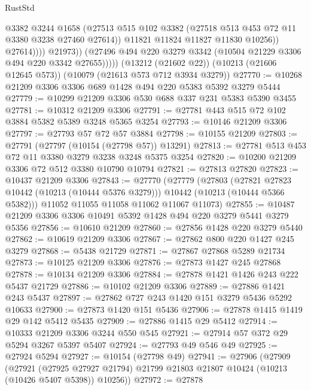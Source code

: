 \begin{lexlean}{RustStd}
\begin{coremodule}
                          @3382
                          @3244
                          @1658
                          (@27513
                            @515
                            @102
                            @3382
                            (@27518 @513 @453 @72 @11 @3380 @3238 @27460 @27614))
                          @11821
                          @11824
                          @11827
                          @11830
                          @10256))
                      @27614))))
              @21973))
          (@27496 @494 @220 @3279 @3342 (@10504 @21229 @3306 @494 @220 @3342 @27655)))))
    (@13212 (@21602 @22))
    (@10213 (@21606 @12645 @573))
    (@10079 (@21613 @573 @712 @3934 @3279))
@27770 := @10268 @21209 @3306 @3306 @689 @1428 @494 @220 @5383 @5392 @3279 @5444
@27779 := @10299 @21209 @3306 @530 @688 @337 @231 @5383 @5390 @3455
@27781 := @10312 @21209 @3306
@27791 := @27781 @443 @515 @72 @102 @3884 @5382 @5389 @3248 @5365 @3254
@27793 := @10146 @21209 @3306
@27797 := @27793 @57 @72 @57 @3884
@27798 := @10155 @21209
@27803 := @27791 (@27797 (@10154 (@27798 @57)) @13291)
@27813 := @27781 @513 @453 @72 @11 @3380 @3279 @3238 @3248 @5375 @3254
@27820 := @10200 @21209 @3306 @72 @512 @3380 @10790 @10794
@27821 := @27813 @27820
@27823 := @10437 @21209 @3306
@27843 := @27770
    (@27779
      (@27803
        (@27821 @27823 @10442 (@10213 (@10444 @5376 @3279)))
        @10442
        (@10213 (@10444 @5366 @5382)))
      @11052
      @11055
      @11058
      @11062
      @11067
      @11073)
@27855 := @10487 @21209 @3306 @3306 @10491 @5392 @1428 @494 @220 @3279 @5441 @3279 @5356
@27856 := @10610 @21209
@27860 := @27856 @1428 @220 @3279 @5440
@27862 := @10619 @21209 @3306
@27867 := @27862 @800 @220 @1427 @245 @3279
@27868 := @5438 @21729
@27871 := @27867 @27868 @5289 @21734
@27873 := @10125 @21209 @3306
@27876 := @27873 @1427 @245 @27868
@27878 := @10134 @21209 @3306
@27884 := @27878 @1421 @1426 @243 @222 @5437 @21729
@27886 := @10102 @21209 @3306
@27889 := @27886 @1421 @243 @5437
@27897 := @27862 @727 @243 @1420 @151 @3279 @5436 @5292 @10633
@27900 := @27873 @1420 @151 @5436
@27906 := @27878 @1415 @1419 @29 @142 @5412 @5435
@27909 := @27886 @1415 @29 @5412
@27914 := @10333 @21209 @3306 @3244 @550 @545
@27921 := @27914 @57 @372 @29 @5294 @3267 @5397 @5407
@27924 := @27793 @49 @546 @49
@27925 := @27924 @5294
@27927 := @10154 (@27798 @49)
@27941 := @27906
    (@27909
      (@27921
        (@27925 @27927 @21794)
        @21799
        @21803
        @21807
        @10424
        (@10213 (@10426 @5407 @5398))
        @10256))
@27972 := @27878

\end{coremodule}
\end{lexlean}
